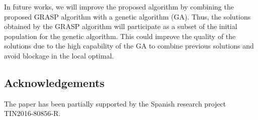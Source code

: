 \documentclass[letterpaper]{article} %
\begin{document}
In future works, we will improve the proposed algorithm by combining the proposed GRASP algorithm with a genetic algorithm (GA). Thus, the solutions obtained by the GRASP algorithm will participate as a subset of the initial population for the genetic algorithm. This could improve the quality of the solutions due to the high capability of the GA to combine previous solutions and avoid blockage in the local optimal.


\subsection*{Acknowledgements}
The paper has been partially supported by the Spanish research project TIN2016-80856-R.



\end{document}
